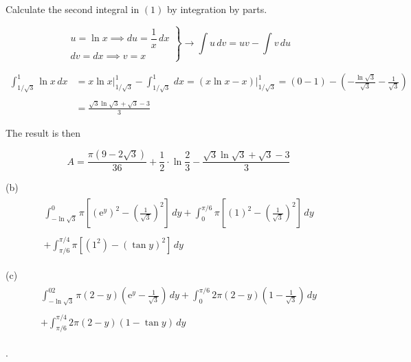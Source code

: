 \documentclass{article}
\begin{document}
\hfill

\noindent Calculate the second integral in $(1)$ by integration by parts.

\[\left.\begin{array}{c}
u=\ln x\implies du=\dfrac1x\,dx\\[1em]
dv=dx\implies v=x
\end{array}\right\}\rightarrow \int u\,dv=uv-\int v\,du\]

\begin{align*}\int_{1/\sqrt3}^1\ln x\,dx&=x\ln x\bigg|_{1/\sqrt3}^1-\int_{1/\sqrt3}^1\,dx=\left(x\ln x-x\right)\Bigg|_{1/\sqrt3}^1=\left(0-1\right)-\left(-\frac{\ln\sqrt3}{\sqrt3}-\frac1{\sqrt3}\right)\\\\&=\frac{\sqrt3\ln\sqrt3+\sqrt3-3}3\end{align*}

\hfill

\noindent The result is then

\[A=\boxed{\frac{\pi\left(9-2\sqrt3\right)}{36}+\frac12\cdot\ln\frac23-\frac{\sqrt3\ln\sqrt3+\sqrt3-3}3}\]

\hfill

\noindent (b)
\begin{align*}\boxed{\begin{array}{l}\displaystyle\int_{-\ln\sqrt3}^0\pi\left[\left(\mathrm{e}^y\right)^2-\left(\frac1{\sqrt3}\right)^2\right]\,dy+\int_0^{\pi/6}\pi\left[(1)^2-\left(\frac1{\sqrt3}\right)^2\right]\,dy\\\\\displaystyle+\int_{\pi/6}^{\pi/4}\pi\left[(1^2)-\left(\tan y\right)^2\right]\,dy\end{array}}\end{align*}

\hfill

\noindent (c)
\begin{align*}\boxed{\begin{array}{l}\displaystyle\int_{-\ln\sqrt3}^02\pi\left(2-y\right)\left(\mathrm{e}^y-\frac1{\sqrt3}\right)\,dy+\int_0^{\pi/6}2\pi\left(2-y\right)\left(1-\frac1{\sqrt3}\right)\,dy\\\\\displaystyle+\int_{\pi/6}^{\pi/4}2\pi\left(2-y\right)\left(1-\tan y\right)\,dy\end{array}}\end{align*}

\hfill

.
\end{document}
